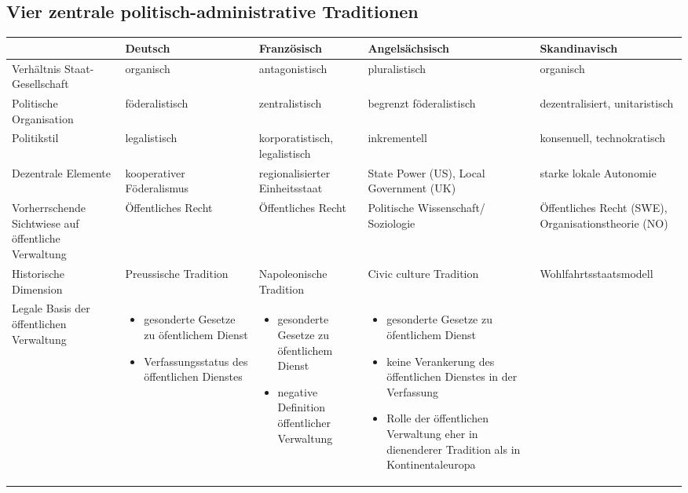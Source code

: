 \begin{landscape}

\chapter{Vier zentrale politisch-administrative Traditionen}	
	
\renewcommand{\arraystretch}{1.4} 
\begin{table}[!hbt]\tiny
\begin{tabular}{|L{4cm}|L{5cm}|L{5cm}|L{5cm}|L{5cm}|}\hline
&\textbf {\footnotesize Deutsch}&	\textbf{\footnotesize Französisch}&\textbf {\footnotesize Angelsächsisch}&	\textbf{\footnotesize Skandinavisch}\\\hline
Verhältnis Staat-Gesellschaft&	organisch&	antagonistisch&	pluralistisch&	organisch\\\hline
Politische Organisation&föderalistisch&zentralistisch	&begrenzt föderalistisch&dezentralisiert, unitaristisch\\\hline
Politikstil&	legalistisch	&korporatistisch, legalistisch&	inkrementell&	konsenuell, technokratisch\\\hline
Dezentrale Elemente&	kooperativer Föderalismus&	regionalisierter Einheitsstaat&	State Power (US), Local Government (UK)&	starke lokale Autonomie\\\hline
Vorherrschende Sichtwiese auf öffentliche Verwaltung&	Öffentliches Recht	&Öffentliches Recht&	Politische Wissenschaft/ Soziologie	&Öffentliches Recht (SWE), Organisationstheorie (NO)\\\hline
Historische Dimension&	Preussische Tradition	&Napoleonische Tradition&	Civic culture Tradition&	Wohlfahrtsstaatsmodell\\\hline
Legale Basis der öffentlichen Verwaltung
&
\begin{itemize}
\item gesonderte Gesetze zu öfentlichem Dienst
\item Verfassungsstatus des öffentlichen Dienstes
\end{itemize}
&
\begin{itemize}
\item gesonderte Gesetze zu öfentlichem Dienst            
\item negative Definition öffentlicher Verwaltung 
\end{itemize}
&
 \vspace{-2mm}
\begin{itemize}
\item gesonderte Gesetze zu öfentlichem Dienst
\item keine Verankerung des öffentlichen Dienstes in der Verfassung
\item Rolle der öffentlichen Verwaltung eher in dienenderer Tradition als in Kontinentaleuropa
 \vspace{-2mm}
 \end{itemize}


\end{tabular}
\end{table}
\end{landscape}
